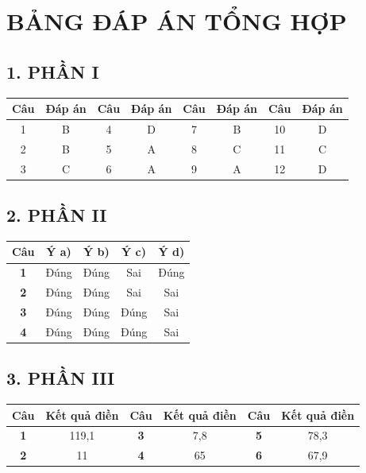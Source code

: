 \documentclass[12pt,a4paper]{article}
\begin{document}
\newpage
\section*{BẢNG ĐÁP ÁN TỔNG HỢP}

\subsection*{1. PHẦN I}
\begin{center}
\begin{tabular}{|c|c||c|c||c|c||c|c|}
\hline
\textbf{Câu} & \textbf{Đáp án} & \textbf{Câu} & \textbf{Đáp án} & \textbf{Câu} & \textbf{Đáp án} & \textbf{Câu} & \textbf{Đáp án} \\ \hline
1 & B & 4 & D & 7 & B & 10 & D \\ \hline
2 & B & 5 & A & 8 & C & 11 & C \\ \hline
3 & C & 6 & A & 9 & A & 12 & D \\ \hline
\end{tabular}
\end{center}

\subsection*{2. PHẦN II}
\begin{center}
\begin{tabular}{|c|c|c|c|c|}
\hline
\textbf{Câu} & \textbf{Ý a)} & \textbf{Ý b)} & \textbf{Ý c)} & \textbf{Ý d)} \\ \hline
\textbf{1} & Đúng & Đúng & Sai & Đúng \\ \hline
\textbf{2} & Đúng & Đúng & Sai & Sai \\ \hline
\textbf{3} & Đúng & Đúng & Đúng & Sai \\ \hline
\textbf{4} & Đúng & Đúng & Đúng & Sai \\ \hline
\end{tabular}
\end{center}

\subsection*{3. PHẦN III}
\begin{center}
\begin{tabular}{|c|c||c|c||c|c|}
\hline
\textbf{Câu} & \textbf{Kết quả điền} & \textbf{Câu} & \textbf{Kết quả điền} & \textbf{Câu} & \textbf{Kết quả điền} \\ \hline
\textbf{1} & 119,1 & \textbf{3} & 7,8 & \textbf{5} & 78,3 \\ \hline
\textbf{2} & 11 & \textbf{4} & 65 & \textbf{6} & 67,9 \\ \hline
\end{tabular}
\end{center}
\end{document}
